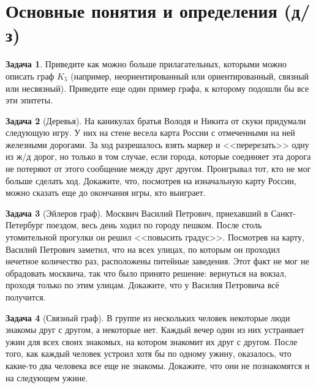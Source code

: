 \documentclass[12pt,a4paper,fleqn]{article}
\theoremstyle{definition}
\newtheorem{exersize}{Задача}[section]
\begin{document}
\section{Основные понятия и определения (д/з)}
\begin{exersize}
	Приведите как можно больше прилагательных, которыми можно описать граф $K_5$ (например, неориентированный или ориентированный, связный или несвязный). Приведите еще один пример графа, к которому подошли бы все эти эпитеты.
\end{exersize}

\begin{exersize}[Деревья]
	На каникулах братья Володя и Никита от скуки придумали следующую игру. У них на стене весела карта России с отмеченными на ней железными дорогами. За ход разрешалось взять маркер и <<перерезать>> одну из ж/д дорог, но только в том случае, если города, которые соединяет эта дорога не потеряют от этого сообщение между друг другом. Проигрывал тот, кто не мог больше сделать ход. Докажите, что, посмотрев на изначальную карту России, можно сказать еще до окончания игры, кто выиграет.
\end{exersize}

\begin{exersize}[Эйлеров граф]
	Москвич Василий Петрович, приехавший в Санкт-Петербург поездом, весь день ходил по городу пешком. После столь утомительной прогулки он решил <<повысить градус>>. Посмотрев на карту, Василий Петрович заметил, что на всех улицах, по которым он проходил нечетное количество раз, расположены питейные заведения. Этот факт не мог не обрадовать москвича, так что было принято решение: вернуться на вокзал, проходя только по этим улицам. Докажите, что у Василия Петровича всё получится.
\end{exersize}
\begin{exersize}[Связный граф]
	В группе из нескольких человек некоторые люди знакомы друг с другом, а некоторые нет. Каждый вечер один из них устраивает ужин для всех своих знакомых, на котором знакомит их друг с другом. После того, как каждый человек устроил хотя бы по одному ужину, оказалось, что какие-то два человека все еще не знакомы. Докажите, что они не познакомятся и на следующем ужине.
\end{exersize}

\newpage
\end{document}

